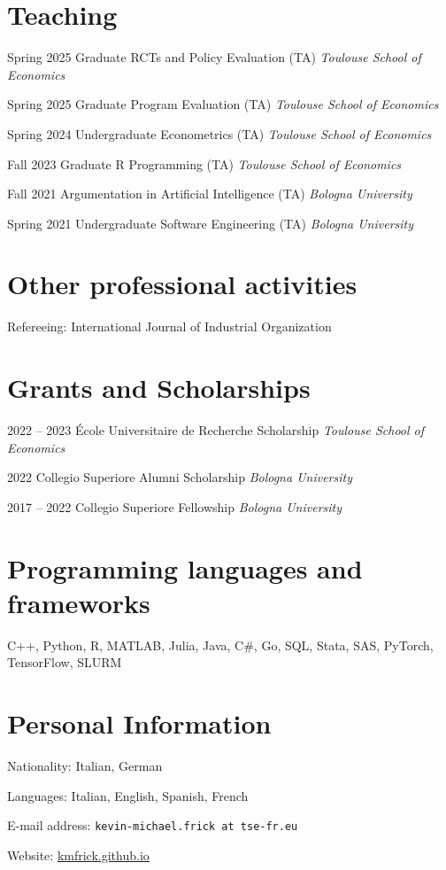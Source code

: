 \documentclass[11pt,a4paper]{article}
\begin{document}
\begin{cv}
  \section*{Teaching}
  \begin{cvlist}{}
  \itemsep -5pt
  \item[Spring 2025] Graduate RCTs and Policy Evaluation (TA) \hfill \textit{Toulouse School of Economics}
  \item[Spring 2025] Graduate Program Evaluation (TA) \hfill \textit{Toulouse School of Economics}
\item[Spring 2024] Undergraduate Econometrics (TA) \hfill \textit{Toulouse School of Economics}
\item[Fall 2023] Graduate R Programming (TA) \hfill \textit{Toulouse School of Economics}
  \item[Fall 2021] Argumentation in Artificial Intelligence (TA) \hfill \textit{Bologna University}
  \item[Spring 2021] Undergraduate Software Engineering (TA) \hfill \textit{Bologna University}
  \end{cvlist}

\section*{Other professional activities}
Refereeing: International Journal of Industrial Organization

\section*{Grants and Scholarships}
\begin{cvlist}{}
	\itemsep -5pt
	\item[2022 -- 2023] École Universitaire de Recherche Scholarship \hfill \textit{Toulouse School of Economics}
	\item[2022] Collegio Superiore Alumni Scholarship \hfill \textit{Bologna University}
	\item[2017 -- 2022] Collegio Superiore Fellowship \hfill \textit{Bologna University}
\end{cvlist}

\section*{Programming languages and frameworks}
    C++, Python, R, MATLAB, Julia, Java, C\#,  Go, SQL, Stata, SAS, PyTorch, TensorFlow, SLURM

\section*{Personal Information}
\begin{cvlist}{}
	\itemsep -5pt
	\item[Nationality:] Italian, German
  \item[Languages:]  Italian, English, Spanish, French
  \item[E-mail address:] \texttt{kevin-michael.frick at tse-fr.eu}
  \item[Website:] \url{kmfrick.github.io}
\end{cvlist}
\end{cv}
\end{document}
